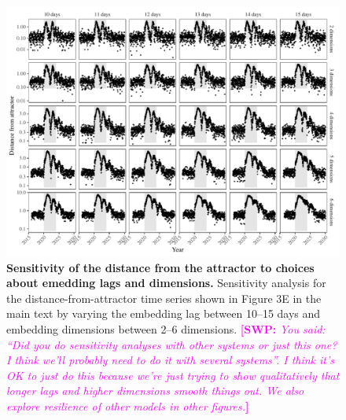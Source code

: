 \documentclass[12pt]{article}
\newcommand{\comment}{\showcomment}
\newcommand{\showcomment}[3]{\textcolor{#1}{\textbf{[#2: }\textsl{#3}\textbf{]}}}
\newcommand{\swp}[1]{\comment{magenta}{SWP}{#1}}
\begin{document}
\begin{figure}[!th]
\includegraphics[width=\textwidth]{../figure3/figure3_sens.pdf}
\caption{
\textbf{Sensitivity of the distance from the attractor to choices about emedding lags and dimensions.}
Sensitivity analysis for the distance-from-attractor time series shown in Figure 3E in the main text by varying the embedding lag between 10--15 days and embedding dimensions between 2--6 dimensions.
\swp{You said: ``Did you do sensitivity analyses with other systems or just this one? I think we'll probably need to do it with several systems''. I think it's OK to just do this because we're just trying to show qualitatively that longer lags and higher dimensions smooth things out. We also explore resilience of other models in other figures.}
}
\end{figure}

\pagebreak
\end{document}
